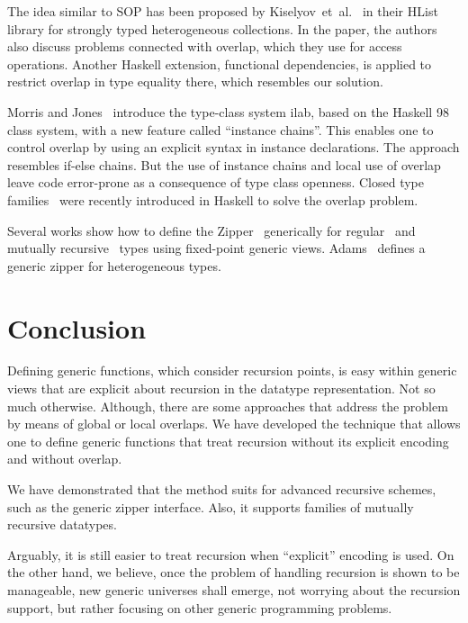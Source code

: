 \documentclass[runningheads]{llncs}
\begin{document}
The idea similar to SOP has been proposed by Kiselyov~et~al.~\cite{Kiselyov2004} in their \textsf{HList} library for strongly typed heterogeneous collections. In the paper, the authors also discuss problems connected with overlap, which they use for access operations. Another Haskell extension, functional dependencies, is applied to restrict overlap in type equality there, which resembles our solution.

Morris and Jones~\cite{Morris2010} introduce the type-class system \textsf{ilab}, based on the Haskell 98 class system, with a new feature called ``instance chains''. This enables one to control overlap by using an explicit syntax in instance declarations. The approach resembles if-else chains. But the use of instance chains and local use of overlap leave code error-prone as a consequence of type class openness. Closed type families~\cite{Eisenberg2014} were recently introduced in Haskell to solve the overlap problem.

Several works show how to define the Zipper~\cite{Huet1997} generically for regular~\cite{HiJeLo2004,McBride2001} and mutually recursive~\cite{MuRec2009} types using fixed-point generic views. Adams~\cite{Adams2010} defines a generic zipper for heterogeneous types.



\section{Conclusion}
\label{sec:conclusion}

Defining generic functions, which consider recursion points, is easy within generic views that are explicit about recursion in the datatype representation. Not so much otherwise. Although, there are some approaches that address the problem by means of global or local overlaps. We have developed the technique that allows one to define generic functions that treat recursion without its explicit encoding and without overlap. 

We have demonstrated that the method suits for advanced recursive schemes, such as the generic zipper interface. Also, it supports families of mutually recursive datatypes. 

Arguably, it is still easier to treat recursion when ``explicit'' encoding is used. On the other hand, we believe, once the problem of handling recursion is shown to be manageable, new generic universes shall emerge, not worrying about the recursion support, but rather focusing on other generic programming problems.

%
%
%


%
\end{document}
